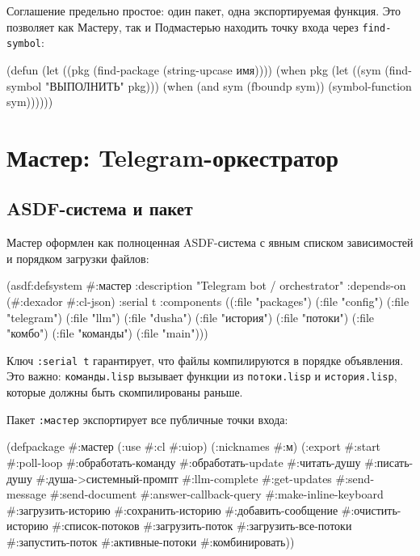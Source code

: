 \documentclass[11pt,a4paper]{article}
\begin{document}
Соглашение предельно простое: один пакет, одна экспортируемая функция. Это позволяет как Мастеру, так и Подмастерью находить точку входа через \texttt{find-symbol}:

\begin{lispcode}[caption={Поиск точки входа через рефлексию}]
(defun %
  (let ((pkg (find-package (string-upcase имя))))
    (when pkg
      (let ((sym (find-symbol "ВЫПОЛНИТЬ" pkg)))
        (when (and sym (fboundp sym))
          (symbol-function sym))))))
\end{lispcode}

\section{Мастер: Telegram-оркестратор}
\label{sec:master}

\subsection{ASDF-система и пакет}

Мастер оформлен как полноценная ASDF-система с явным списком зависимостей и порядком загрузки файлов:

\begin{lispcode}[caption={мастер/cl/мастер.asd}]
(asdf:defsystem #:мастер
  :description "Telegram bot / orchestrator"
  :depends-on (#:dexador #:cl-json)
  :serial t
  :components ((:file "packages")
               (:file "config")
               (:file "telegram")
               (:file "llm")
               (:file "dusha")
               (:file "история")
               (:file "потоки")
               (:file "комбо")
               (:file "команды")
               (:file "main")))
\end{lispcode}

Ключ \texttt{:serial t} гарантирует, что файлы компилируются в порядке объявления. Это важно: \texttt{команды.lisp} вызывает функции из \texttt{потоки.lisp} и \texttt{история.lisp}, которые должны быть скомпилированы раньше.

Пакет \texttt{:мастер} экспортирует все публичные точки входа:

\begin{lispcode}[caption={мастер/cl/packages.lisp}]
(defpackage #:мастер
  (:use #:cl #:uiop)
  (:nicknames #:м)
  (:export
   #:start #:poll-loop
   #:обработать-команду #:обработать-update
   #:читать-душу #:писать-душу #:душа->системный-промпт
   #:llm-complete
   #:get-updates #:send-message #:send-document
   #:answer-callback-query #:make-inline-keyboard
   #:загрузить-историю #:сохранить-историю
   #:добавить-сообщение #:очистить-историю
   #:список-потоков #:загрузить-поток
   #:загрузить-все-потоки #:запустить-поток
   #:активные-потоки #:комбинировать))
\end{lispcode}
\end{document}
